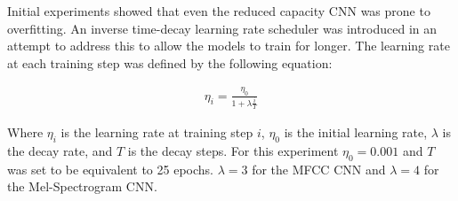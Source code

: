 Initial experiments showed that even the reduced capacity CNN was prone to overfitting. An inverse time-decay learning rate scheduler was introduced in an attempt to address this to allow the models to train for longer. The learning rate at each training step was defined by the following equation:

\begin{align}
    \eta_i = \frac{\eta_0}{1 + \lambda\frac{i}{T}}
\end{align}

Where $\eta_i$ is the learning rate at training step $i$, $\eta_0$ is the initial learning rate, $\lambda$ is the decay rate, and $T$ is the decay steps. For this experiment $\eta_0=0.001$ and $T$ was set to be equivalent to 25 epochs. $\lambda=3$ for the MFCC CNN and $\lambda=4$ for the Mel-Spectrogram CNN.

